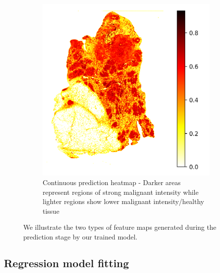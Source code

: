 \documentclass{l4proj}
\begin{document}
\begin{figure}[h]
    ~~
    \begin{subfigure}[b]{0.4\textwidth}
        \includegraphics[scale=0.3]{images/TCGA-BH-A1FE-continuous.png}
        \caption{Continuous prediction heatmap - Darker areas represent regions of strong malignant intensity while lighter regions show lower malignant intensity/healthy tissue}
        \label{fig:continuous-heatmap}
    \end{subfigure}

    \caption{We illustrate the two types of feature maps generated during the prediction stage by our trained model. }
    \label{fig:visualization-example}
\end{figure}

\subsection{Regression model fitting}
\end{document}

